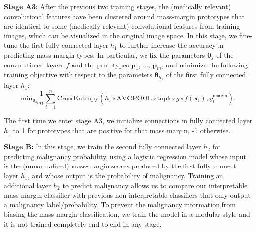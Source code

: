 \documentclass[11pt]{article}
\begin{document}
\textbf{Stage A3:} After the previous two training stages, the (medically relevant) convolutional features have been clustered around mass-margin prototypes that are identical to some (medically relevant) convolutional features from training images, which can be visualized in the original image space. In this stage, we fine-tune the first fully connected layer $h_1$ to further increase the accuracy in predicting mass-margin types. In particular, we fix the parameters $\mathbf{\theta}_f$ of the convolutional layers $f$ and the prototypes $\mathbf{p}_1$, ..., $\mathbf{p}_m$, and minimize the following training objective with respect to the parameters $\mathbf{\theta}_{h_1}$ of the first fully connected layer $h_1$:
\begin{equation}
\textrm{min}_{\mathbf{\theta}_{h_1}} \frac{1}{n} \sum_{i=1}^n \textrm{CrossEntropy}(h_1 \circ \textrm{AVGPOOL} \circ \textrm{topk} \circ g \circ f(\mathbf{x}_i), y^{\text{margin}}_i). \label{app:eq:h1_training}
\end{equation}

The first time we enter stage A3, we initialize connections in fully connected layer $h_1$ to 1 for prototypes that are positive for that mass margin, -1 otherwise.

\textbf{Stage B:} In this stage, we train the second fully connected layer $h_2$ for predicting malignancy probability, using a logistic regression model whose input is the (unnormalized) mass-margin scores produced by the first fully connect layer $h_1$, and whose output is the probability of malignancy. Training an additional layer $h_2$ to predict malignancy allows us to compare our interpretable mass-margin classifier with previous non-interpretable classifiers that only output a malignancy label/probability. To prevent the malignancy information from biasing the mass margin classification, we train the model in a modular style and it is not trained completely end-to-end in any stage.

\FloatBarrier
\end{document}
